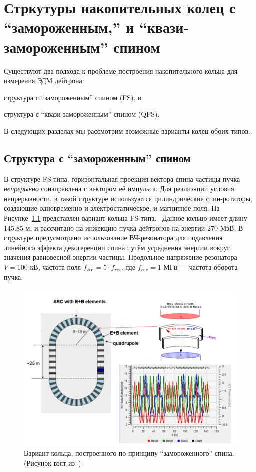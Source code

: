 \chapter{Стркутуры накопительных колец с ``замороженным,'' и ``квази-замороженным'' спином} \label{chpt:FS_and_QFS_lattices}

Существуют два подхода к проблеме построения накопительного кольца для измерения ЭДМ дейтрона: 
\begin{enumerate*}
	\item структура с ``замороженным'' спином (FS), и 
	\item структура с ``квази-замороженным'' спином (QFS).
\end{enumerate*}

В следующих разделах мы рассмотрим возможные варианты колец обоих типов.

\section{Структура с ``замороженным'' спином} \label{sec:FS_BNL_lattice}
В структуре FS-типа, горизонтальная проекция вектора спина частицы пучка \emph{непрерывно} сонаправлена с вектором её импульса. Для реализации условия непрерывности, в такой структуре используются цилиндрические спин-ротаторы, создающие одновременно и электростатическое, и магнитное поля. На Рисунке~\ref{fig:BNL_lattice} представлен вариант кольца FS-типа.~\cite{Senichev:Lattices} Данное кольцо имеет длину 145.85 м, и рассчитано на инжекцию пучка дейтронов на энергии 270 МэВ. В структуре предусмотрено использование ВЧ-резонатора для подавления линейного эффекта декогеренции спина путём усреднения энергии вокруг значения равновесной энергии частицы. Продольное напряжение резонатора $V = 100$ кВ, частота поля $f_{RF} = 5\cdot f_{rev}$, где $f_{rev} = 1$ МГц --- частота оборота пучка.

\begin{figure}[h!]
	\centering
	\includegraphics[width=\linewidth]{images/chapter2/BNL_lattice}
	\caption{Вариант кольца, построенного по принципу ``замороженного'' спина. (Рисунок взят из~\cite{Senichev:Lattices})\label{fig:BNL_lattice}}
\end{figure}


